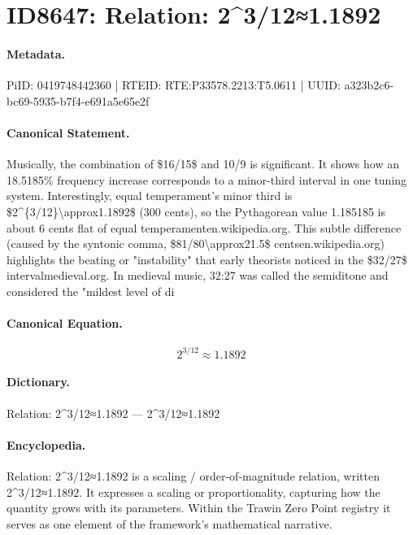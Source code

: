 \section*{ID8647: Relation: 2\textasciicircum{}3/12≈1.1892}
\paragraph{Metadata.}
PiID: 0419748442360 | RTEID: RTE:P33578.2213:T5.0611 | UUID: a323b2c6-bc69-5935-b7f4-e691a5e65e2f

\paragraph{Canonical Statement.}
Musically, the combination of \$16/15\$ and 10/9 is significant. It shows how an 18.5185\% frequency increase corresponds to a minor-third interval in one tuning system. Interestingly, equal temperament's minor third is \$2\textasciicircum{}\{3/12\}\textbackslash{}approx1.1892\$ (300 cents), so the Pythagorean value 1.185185 is about 6 cents flat of equal temperamenten.wikipedia.org. This subtle difference (caused by the syntonic comma, \$81/80\textbackslash{}approx21.5\$ centsen.wikipedia.org) highlights the beating or "instability" that early theorists noticed in the \$32/27\$ intervalmedieval.org. In medieval music, 32:27 was called the semiditone and considered the "mildest level of di

\paragraph{Canonical Equation.}
\[
2^{3/12}\approx1.1892
\]

\paragraph{Dictionary.}
Relation: 2\textasciicircum{}3/12≈1.1892 — 2\textasciicircum{}3/12≈1.1892

\paragraph{Encyclopedia.}
Relation: 2\textasciicircum{}3/12≈1.1892 is a scaling / order-of-magnitude relation, written 2\textasciicircum{}3/12≈1.1892. It expresses a scaling or proportionality, capturing how the quantity grows with its parameters. Within the Trawin Zero Point registry it serves as one element of the framework's mathematical narrative.
